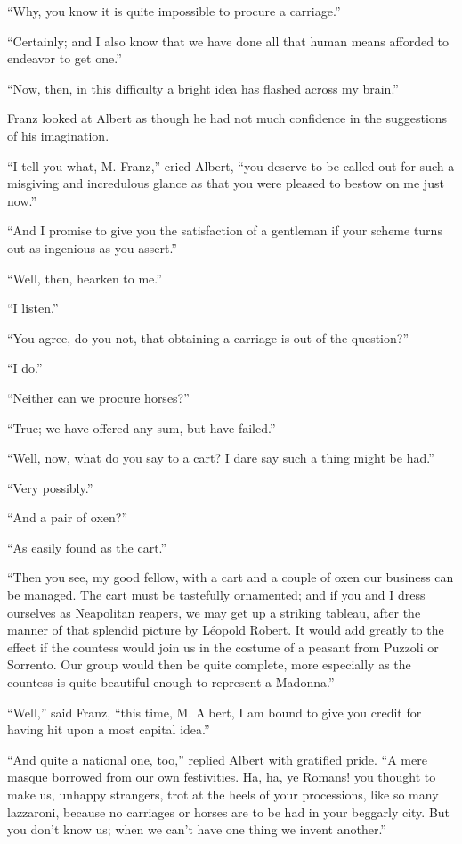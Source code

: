 “Why, you know it is quite impossible to procure a carriage.”

“Certainly; and I also know that we have done all that human means
afforded to endeavor to get one.”

“Now, then, in this difficulty a bright idea has flashed across my
brain.”

Franz looked at Albert as though he had not much confidence in the
suggestions of his imagination.

“I tell you what, M. Franz,” cried Albert, “you deserve to be called
out for such a misgiving and incredulous glance as that you were
pleased to bestow on me just now.”

“And I promise to give you the satisfaction of a gentleman if your
scheme turns out as ingenious as you assert.”

“Well, then, hearken to me.”

“I listen.”

“You agree, do you not, that obtaining a carriage is out of the
question?”

“I do.”

“Neither can we procure horses?”

“True; we have offered any sum, but have failed.”

“Well, now, what do you say to a cart? I dare say such a thing might be
had.”

“Very possibly.”

“And a pair of oxen?”

“As easily found as the cart.”

“Then you see, my good fellow, with a cart and a couple of oxen our
business can be managed. The cart must be tastefully ornamented; and if
you and I dress ourselves as Neapolitan reapers, we may get up a
striking tableau, after the manner of that splendid picture by Léopold
Robert. It would add greatly to the effect if the countess would join
us in the costume of a peasant from Puzzoli or Sorrento. Our group
would then be quite complete, more especially as the countess is quite
beautiful enough to represent a Madonna.”

“Well,” said Franz, “this time, M. Albert, I am bound to give you
credit for having hit upon a most capital idea.”

“And quite a national one, too,” replied Albert with gratified pride.
“A mere masque borrowed from our own festivities. Ha, ha, ye Romans!
you thought to make us, unhappy strangers, trot at the heels of your
processions, like so many lazzaroni, because no carriages or horses are
to be had in your beggarly city. But you don’t know us; when we can’t
have one thing we invent another.”

